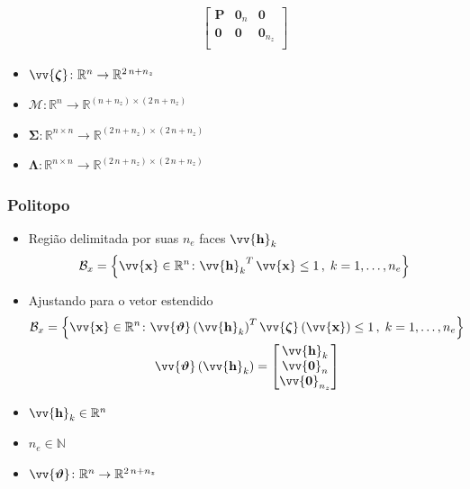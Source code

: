 \documentclass{beamer}
\newcommand*{\Round}[1]{\left(#1\right)}
\newcommand*{\Curly}[1]{\left\{#1\right\}}
\newcommand*{\Set}[1]{\Curly{#1}}
\newcommand*{\Prod}{\,}
\newcommand*{\Bold}[1]{\boldsymbol{\mathbf{#1}}}
\newcommand*{\Matr}[1]{\Bold{#1}}
\newcommand*{\Vect}[1]{\vv{\Bold{#1}}}
\newcommand*{\Transp}[1]{{#1}^{T}}
\renewcommand{\Prod}{\,}
\begin{document}
\begin{frame}
\begin{itemize}
\begin{align}
\begin{bmatrix}
        \Matr{P}   & \Matr{0}_n & \Matr{0}       \\
        \Matr{0}   & \Matr{0}   & \Matr{0}_{n_z} \\
      \end{bmatrix}
    \end{align}
    \item $\Vect{\zeta} \colon \mathbb{R}^n \to \mathbb{R}^{2 \Prod n + n_z}$
    \item $\Matr{\mathcal{M}} \colon \mathbb{R}^n \to \mathbb{R}^{(n + n_z) \times (2 \Prod n + n_z)}$
    \item $\Matr{\Sigma} \colon \mathbb{R}^{n \times n} \to \mathbb{R}^{(2 \Prod n + n_z) \times (2 \Prod n + n_z)}$
    \item $\Matr{\Lambda} \colon \mathbb{R}^{n \times n} \to \mathbb{R}^{(2 \Prod n + n_z) \times (2 \Prod n + n_z)}$
  \end{itemize}
\end{frame}

\begin{frame}\frametitle{Politopo}
  \begin{itemize}
    \item Região delimitada por suas $n_e$ faces $\Vect{h}_k$
    \begin{equation}
      \mathcal{B}_x
      = \Set{\Vect{x} \in \mathbb{R}^n \colon \Transp{\Vect{h}_k} \Prod \Vect{x} \leq 1 \,,\; k = 1, \dotsc, n_e}
    \end{equation}
    \item Ajustando para o vetor estendido
    \begin{gather}
      \mathcal{B}_x
      = \Set{\Vect{x} \in \mathbb{R}^n \colon \Transp{\Vect{\vartheta}\Round{\Vect{h}_k}} \Prod \Vect{\zeta}\Round{\Vect{x}} \leq 1 \,,\; k = 1, \dotsc, n_e}
      \\
      \Vect{\vartheta}\Round{\Vect{h}_k} = \begin{bmatrix} \Vect{h}_k \\ \Vect{0}_n \\ \Vect{0}_{n_z} \end{bmatrix}
    \end{gather}
    \item $\Vect{h}_k \in \mathbb{R}^n$
    \item $n_e \in \mathbb{N}$
    \item $\Vect{\vartheta} \colon \mathbb{R}^n \to \mathbb{R}^{2 \Prod n + n_z}$
  \end{itemize}
\end{frame}
\end{document}
